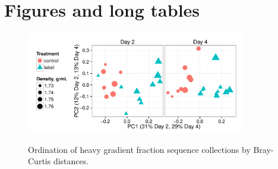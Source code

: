 \section{Figures and long tables}
\newpage



\begin{figure}[H]
  \centering
  \caption{Ordination of heavy gradient fraction sequence collections by Bray-Curtis distances.}
  \includegraphics[width=0.85\textwidth]{figures/ordination_heavy/ordination_heavy_day_facet.pdf}
  \label{fig:ord_heavy}
\end{figure}

